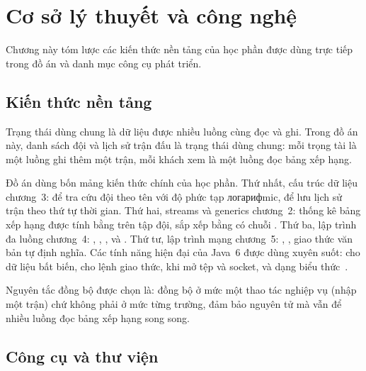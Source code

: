 \chapter{Cơ sở lý thuyết và công nghệ}
\label{ch:coso}

\begin{muctieu}
Chương này tóm lược các kiến thức nền tảng của học phần được dùng trực tiếp
trong đồ án và danh mục công cụ phát triển.
\end{muctieu}

\section{Kiến thức nền tảng}

\begin{dinhnghia}
Trạng thái dùng chung  là dữ liệu được nhiều luồng cùng đọc
và ghi. Trong đồ án này, danh sách đội và lịch sử trận đấu là trạng thái dùng
chung: mỗi trọng tài là một luồng ghi thêm một trận, mỗi khách xem là một luồng
đọc bảng xếp hạng.
\end{dinhnghia}

Đồ án dùng bốn mảng kiến thức chính của học phần. Thứ nhất, cấu trúc dữ liệu
chương~3:  để tra cứu đội theo tên với độ phức tạp логарифmic, 
để lưu lịch sử trận theo thứ tự thời gian. Thứ hai, streams và generics
chương~2: thống kê bảng xếp hạng được tính bằng  trên tập đội, sắp
xếp bằng  có chuỗi . Thứ ba, lập trình
đa luồng chương~4: , , ,
 và . Thứ tư, lập trình mạng
chương~5: , , giao thức văn bản tự định nghĩa.
Các tính năng hiện đại của Java~6 được dùng xuyên suốt:  cho dữ
liệu bất biến,  cho lệnh giao thức,  khi mở
tệp và socket, và  dạng biểu thức~\cite{Bloch2018}.

\begin{ghinho}
Nguyên tắc đồng bộ được chọn là: đồng bộ ở mức một thao tác nghiệp vụ (nhập một
trận) chứ không phải ở mức từng trường, đảm bảo nguyên tử mà vẫn để nhiều luồng
đọc bảng xếp hạng song song.
\end{ghinho}

\section{Công cụ và thư viện}

